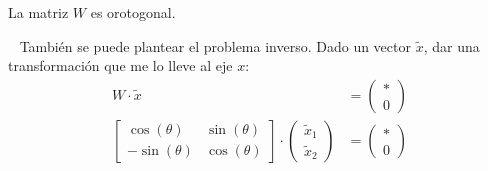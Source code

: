 \documentclass[]{article}
\begin{document}

\begin{obs}
	La matriz $W$ es orotogonal.
\end{obs}

~\newline
También se puede plantear el problema inverso. Dado un vector $\tilde{x}$, dar una transformación que me lo lleve al eje $x$:
\begin{align*}
	W \cdot \tilde x &= \begin{pmatrix}
		*\\0
	\end{pmatrix}\\
	\begin{bmatrix}
		\cos(\theta) & \sin(\theta)\\
		-\sin(\theta) & \cos(\theta)
	\end{bmatrix}\cdot \begin{pmatrix}
		\tilde x_1 \\ \tilde x_2
	\end{pmatrix} &= \begin{pmatrix}
		*\\0
	\end{pmatrix}
\end{align*}
\end{document}
